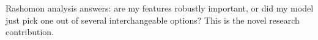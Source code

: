 
\begin{keyidea}
Rashomon analysis answers: are my features robustly important, or did my model just pick one out of several interchangeable options?
This is the novel research contribution.
\end{keyidea}

